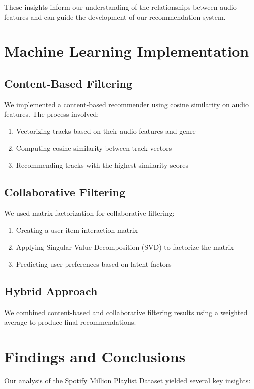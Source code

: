 \documentclass[runningheads]{llncs}
\begin{document}
These insights inform our understanding of the relationships between audio features and can guide the development of our recommendation system.

\section{Machine Learning Implementation}

\subsection{Content-Based Filtering}
We implemented a content-based recommender using cosine similarity on audio features. The process involved:
\begin{enumerate}
    \item Vectorizing tracks based on their audio features and genre
    \item Computing cosine similarity between track vectors
    \item Recommending tracks with the highest similarity scores
\end{enumerate}

\subsection{Collaborative Filtering}
We used matrix factorization for collaborative filtering:
\begin{enumerate}
    \item Creating a user-item interaction matrix
    \item Applying Singular Value Decomposition (SVD) to factorize the matrix
    \item Predicting user preferences based on latent factors
\end{enumerate}

\subsection{Hybrid Approach}
We combined content-based and collaborative filtering results using a weighted average to produce final recommendations.

\section{Findings and Conclusions}

Our analysis of the Spotify Million Playlist Dataset yielded several key insights:
\end{document}
